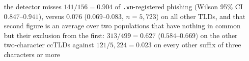 the detector misses $141/156 = 0.904$ of \texttt{.vn}-registered phishing (Wilson 95\% CI $0.847$--$0.941$), versus $0.076$ ($0.069$--$0.083$, $n=5{,}723$) on all other TLDs, and that second figure is an average over two populations that have nothing in common but their exclusion from the first: $313/499 = 0.627$ ($0.584$--$0.669$) on the other two-character ccTLDs against $121/5{,}224 = 0.023$ on every other suffix of three characters or more%
